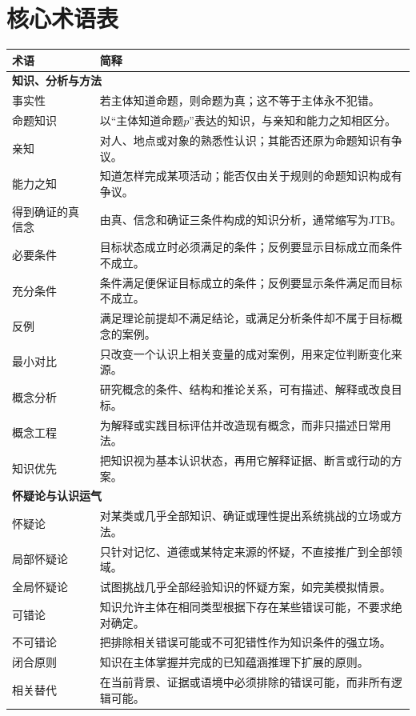 \chapter{核心术语表}

\begin{longtable}{p{}p{}}
\toprule
术语 & 简释\\\midrule\endhead
\multicolumn{2}{l}{\textbf{知识、分析与方法}}\\
事实性 & 若主体知道命题，则命题为真；这不等于主体永不犯错。\\
命题知识 & 以“主体知道命题$p$”表达的知识，与亲知和能力之知相区分。\\
亲知 & 对人、地点或对象的熟悉性认识；其能否还原为命题知识有争议。\\
能力之知 & 知道怎样完成某项活动；能否仅由关于规则的命题知识构成有争议。\\
得到确证的真信念 & 由真、信念和确证三条件构成的知识分析，通常缩写为JTB。\\
必要条件 & 目标状态成立时必须满足的条件；反例要显示目标成立而条件不成立。\\
充分条件 & 条件满足便保证目标成立的条件；反例要显示条件满足而目标不成立。\\
反例 & 满足理论前提却不满足结论，或满足分析条件却不属于目标概念的案例。\\
最小对比 & 只改变一个认识上相关变量的成对案例，用来定位判断变化来源。\\
概念分析 & 研究概念的条件、结构和推论关系，可有描述、解释或改良目标。\\
概念工程 & 为解释或实践目标评估并改造现有概念，而非只描述日常用法。\\
知识优先 & 把知识视为基本认识状态，再用它解释证据、断言或行动的方案。\\
\multicolumn{2}{l}{\textbf{怀疑论与认识运气}}\\
怀疑论 & 对某类或几乎全部知识、确证或理性提出系统挑战的立场或方法。\\
局部怀疑论 & 只针对记忆、道德或某特定来源的怀疑，不直接推广到全部领域。\\
全局怀疑论 & 试图挑战几乎全部经验知识的怀疑方案，如完美模拟情景。\\
可错论 & 知识允许主体在相同类型根据下存在某些错误可能，不要求绝对确定。\\
不可错论 & 把排除相关错误可能或不可犯错性作为知识条件的强立场。\\
闭合原则 & 知识在主体掌握并完成的已知蕴涵推理下扩展的原则。\\
相关替代 & 在当前背景、证据或语境中必须排除的错误可能，而非所有逻辑可能。\\

\end{longtable}
